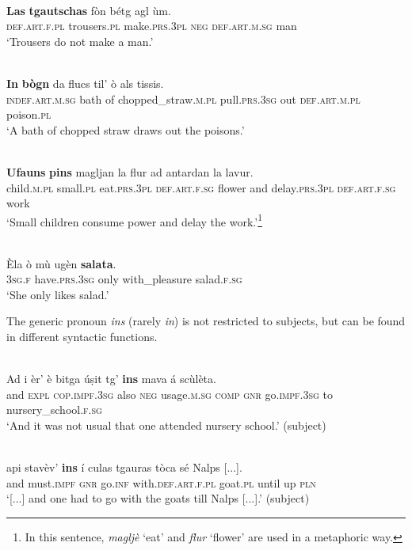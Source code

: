 \ea\label{ex:gen:3}
\\
\gll \textbf{Las} \textbf{tgautschas} fòn bétg agl ùm. \\
  \textsc{def.art.f.pl} trousers.\textsc{pl} make.\textsc{prs.3pl} \textsc{neg} \textsc{def.art.m.sg} man \\
\glt `Trousers do not make a man.'
\z


\ea\label{ex:gen:4}
\\
\gll  \textbf{In} \textbf{bògn} da flucs til’ ò als tissis.\\
\textsc{indef.art.m.sg} bath of chopped\_straw.\textsc{m.pl} pull.\textsc{prs.3sg} out \textsc{def.art.m.pl} poison.\textsc{pl} \\
\glt `A bath of chopped straw draws out the poisons.'
\z

\ea
\label{ex:gen:5}
\\
\gll  \textbf{Ufauns} \textbf{pins} magljan la flur ad antardan la lavur.\\
child.\textsc{m.pl} small.\textsc{pl} eat.\textsc{prs.3pl} \textsc{def.art.f.sg} flower and delay.\textsc{prs.3pl} \textsc{def.art.f.sg} work\\
\glt `Small children consume power and delay the work.'\footnote{In this sentence, \textit{magljè} `eat' and \textit{flur} `flower' are used in a metaphoric way.}
\z

\ea\label{ex:gen:6}
\\
\gll Èla ò mù ugèn \textbf{salata}.\\
\textsc{3sg.f} have.\textsc{prs.3sg} only with\_pleasure salad.\textsc{f.sg}\\
\glt `She only likes salad.'
\z

The generic pronoun \textit{ins} (rarely \textit{in}) is not restricted to subjects, but can be found in different syntactic functions.

\ea\label{ex:ins:1}
\\ 
\gll Ad i èr’ è bitga úṣit tg’ \textbf{ins} mava á scùlèta.\\
and  \textsc{expl} \textsc{cop.impf.3sg} also \textsc{neg} usage.\textsc{m.sg}  \textsc{comp} \textsc{gnr} go.\textsc{impf.3sg} to nursery\_school.\textsc{f.sg}\\
\glt `And it was not usual that one attended nursery school.' (subject)
\z

\ea
\label{ex:ins:2}
\\ 
\gll   [...] api stavèv’ \textbf{ins} í culas tgauras tòca sé Nalps [...]. \\
{} and  must.\textsc{impf} \textsc{gnr} go.\textsc{inf} with.\textsc{def.art.f.pl} goat.\textsc{pl} until up  \textsc{pln}\\
\glt `[...] and one had to go with the goats till Nalps [...].' (subject)
\z

